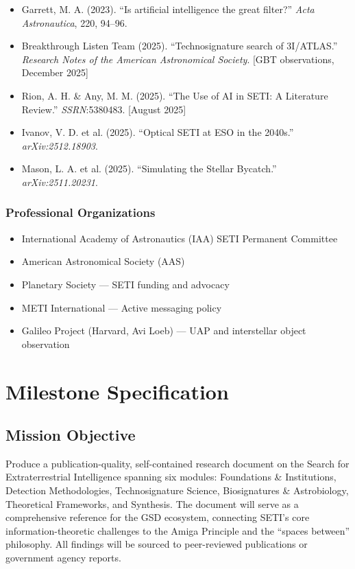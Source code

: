 \documentclass[11pt,letterpaper]{article}
\newcommand{\stageheader}[2]{%
  \noindent\colorbox{#2}{\makebox[\textwidth][l]{%
    \textcolor{white}{\bfseries\sffamily\hspace{6pt}#1\hspace{6pt}}}}%
  \vspace{0.5em}\par%
}
\begin{document}
\begin{itemize}[leftmargin=1.5em]
  \item Garrett, M. A. (2023). ``Is artificial intelligence the great filter?'' \textit{Acta Astronautica}, 220, 94--96.
  \item Breakthrough Listen Team (2025). ``Technosignature search of 3I/ATLAS.'' \textit{Research Notes of the American Astronomical Society}. [GBT observations, December 2025]
  \item Rion, A. H. \& Any, M. M. (2025). ``The Use of AI in SETI: A Literature Review.'' \textit{SSRN}:5380483. [August 2025]
  \item Ivanov, V. D. et al. (2025). ``Optical SETI at ESO in the 2040s.'' \textit{arXiv:2512.18903}.
  \item Mason, L. A. et al. (2025). ``Simulating the Stellar Bycatch.'' \textit{arXiv:2511.20231}.
\end{itemize}

\subsubsection{Professional Organizations}

\begin{itemize}[leftmargin=1.5em]
  \item International Academy of Astronautics (IAA) SETI Permanent Committee
  \item American Astronomical Society (AAS)
  \item Planetary Society --- SETI funding and advocacy
  \item METI International --- Active messaging policy
  \item Galileo Project (Harvard, Avi Loeb) --- UAP and interstellar object observation
\end{itemize}

\newpage
\stageheader{STAGE 3 --- MISSION PACKAGE}{tertiary}

\section{Milestone Specification}

\subsection{Mission Objective}

Produce a publication-quality, self-contained research document on the Search for Extraterrestrial Intelligence spanning six modules: Foundations \& Institutions, Detection Methodologies, Technosignature Science, Biosignatures \& Astrobiology, Theoretical Frameworks, and Synthesis. The document will serve as a comprehensive reference for the GSD ecosystem, connecting SETI's core information-theoretic challenges to the Amiga Principle and the ``spaces between'' philosophy. All findings will be sourced to peer-reviewed publications or government agency reports.
\end{document}
